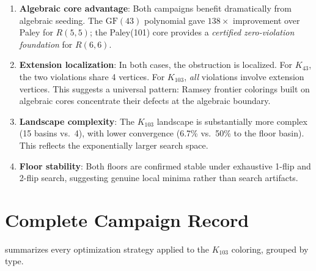 \documentclass[11pt,a4paper]{article}
\theoremstyle{plain}
\theoremstyle{remark}
\newcommand{\GF}{\mathrm{GF}}
\begin{document}
\begin{enumerate}[leftmargin=2em]
  \item \textbf{Algebraic core advantage}: Both campaigns benefit
    dramatically from algebraic seeding. The $\GF(43)$ polynomial
    gave $138\times$ improvement over Paley for $R(5,5)$; the
    Paley(101) core provides a \emph{certified zero-violation
    foundation} for $R(6,6)$.

  \item \textbf{Extension localization}: In both cases, the
    obstruction is localized. For $K_{43}$, the two violations
    share 4 vertices. For $K_{103}$, \emph{all} violations involve
    extension vertices. This suggests a universal pattern: Ramsey
    frontier colorings built on algebraic cores concentrate their
    defects at the algebraic boundary.

  \item \textbf{Landscape complexity}: The $K_{103}$ landscape is
    substantially more complex (15 basins vs.\ 4), with lower
    convergence (6.7\% vs.\ 50\% to the floor basin). This
    reflects the exponentially larger search space.

  \item \textbf{Floor stability}: Both floors are confirmed stable
    under exhaustive 1-flip and 2-flip search, suggesting genuine
    local minima rather than search artifacts.
\end{enumerate}

\section{Complete Campaign Record}
\label{sec:campaign}

 summarizes every optimization strategy
applied to the $K_{103}$ coloring, grouped by type.
\end{document}
